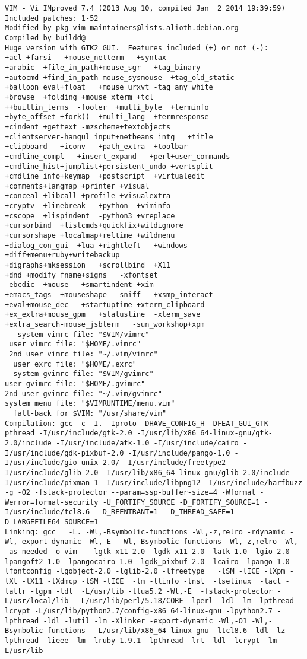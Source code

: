{\tiny 
\begin{verbatim}
VIM - Vi IMproved 7.4 (2013 Aug 10, compiled Jan  2 2014 19:39:59)
Included patches: 1-52
Modified by pkg-vim-maintainers@lists.alioth.debian.org
Compiled by buildd@
Huge version with GTK2 GUI.  Features included (+) or not (-):
+acl +farsi   +mouse_netterm   +syntax
+arabic  +file_in_path+mouse_sgr   +tag_binary
+autocmd +find_in_path-mouse_sysmouse  +tag_old_static
+balloon_eval+float   +mouse_urxvt -tag_any_white
+browse  +folding +mouse_xterm +tcl
++builtin_terms  -footer  +multi_byte  +terminfo
+byte_offset +fork()  +multi_lang  +termresponse
+cindent +gettext -mzscheme+textobjects
+clientserver-hangul_input+netbeans_intg   +title
+clipboard   +iconv   +path_extra  +toolbar
+cmdline_compl   +insert_expand   +perl+user_commands
+cmdline_hist+jumplist+persistent_undo +vertsplit
+cmdline_info+keymap  +postscript  +virtualedit
+comments+langmap +printer +visual
+conceal +libcall +profile +visualextra
+cryptv  +linebreak   +python  +viminfo
+cscope  +lispindent  -python3 +vreplace
+cursorbind  +listcmds+quickfix+wildignore
+cursorshape +localmap+reltime +wildmenu
+dialog_con_gui  +lua +rightleft   +windows
+diff+menu+ruby+writebackup
+digraphs+mksession   +scrollbind  +X11
+dnd +modify_fname+signs   -xfontset
-ebcdic  +mouse   +smartindent +xim
+emacs_tags  +mouseshape  -sniff   +xsmp_interact
+eval+mouse_dec   +startuptime +xterm_clipboard
+ex_extra+mouse_gpm   +statusline  -xterm_save
+extra_search-mouse_jsbterm   -sun_workshop+xpm
   system vimrc file: "$VIM/vimrc"
 user vimrc file: "$HOME/.vimrc"
 2nd user vimrc file: "~/.vim/vimrc"
  user exrc file: "$HOME/.exrc"
  system gvimrc file: "$VIM/gvimrc"
user gvimrc file: "$HOME/.gvimrc"
2nd user gvimrc file: "~/.vim/gvimrc"
system menu file: "$VIMRUNTIME/menu.vim"
  fall-back for $VIM: "/usr/share/vim"
Compilation: gcc -c -I. -Iproto -DHAVE_CONFIG_H -DFEAT_GUI_GTK  -pthread -I/usr/include/gtk-2.0 -I/usr/lib/x86_64-linux-gnu/gtk-2.0/include -I/usr/include/atk-1.0 -I/usr/include/cairo -I/usr/include/gdk-pixbuf-2.0 -I/usr/include/pango-1.0 -I/usr/include/gio-unix-2.0/ -I/usr/include/freetype2 -I/usr/include/glib-2.0 -I/usr/lib/x86_64-linux-gnu/glib-2.0/include -I/usr/include/pixman-1 -I/usr/include/libpng12 -I/usr/include/harfbuzz -g -O2 -fstack-protector --param=ssp-buffer-size=4 -Wformat -Werror=format-security -U_FORTIFY_SOURCE -D_FORTIFY_SOURCE=1 -I/usr/include/tcl8.6  -D_REENTRANT=1  -D_THREAD_SAFE=1  -D_LARGEFILE64_SOURCE=1  
Linking: gcc   -L. -Wl,-Bsymbolic-functions -Wl,-z,relro -rdynamic -Wl,-export-dynamic -Wl,-E  -Wl,-Bsymbolic-functions -Wl,-z,relro -Wl,--as-needed -o vim   -lgtk-x11-2.0 -lgdk-x11-2.0 -latk-1.0 -lgio-2.0 -lpangoft2-1.0 -lpangocairo-1.0 -lgdk_pixbuf-2.0 -lcairo -lpango-1.0 -lfontconfig -lgobject-2.0 -lglib-2.0 -lfreetype   -lSM -lICE -lXpm -lXt -lX11 -lXdmcp -lSM -lICE  -lm -ltinfo -lnsl  -lselinux  -lacl -lattr -lgpm -ldl  -L/usr/lib -llua5.2 -Wl,-E  -fstack-protector -L/usr/local/lib  -L/usr/lib/perl/5.18/CORE -lperl -ldl -lm -lpthread -lcrypt -L/usr/lib/python2.7/config-x86_64-linux-gnu -lpython2.7 -lpthread -ldl -lutil -lm -Xlinker -export-dynamic -Wl,-O1 -Wl,-Bsymbolic-functions  -L/usr/lib/x86_64-linux-gnu -ltcl8.6 -ldl -lz -lpthread -lieee -lm -lruby-1.9.1 -lpthread -lrt -ldl -lcrypt -lm  -L/usr/lib   


\end{verbatim}}
